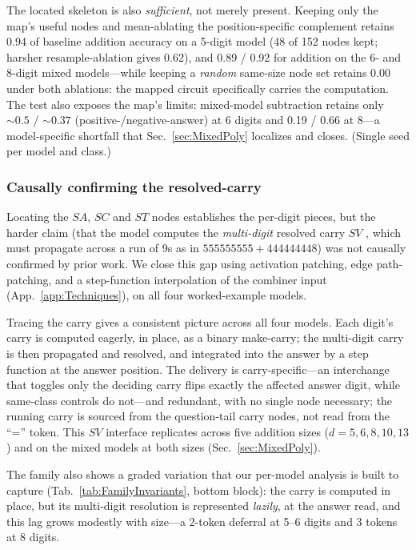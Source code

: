 \documentclass[11pt]{article}
\newcommand{\SAC}{$SA$, }
\newcommand{\SC}{$SC$ }
\newcommand{\ST}{$ST$ }
\newcommand{\SV}{$SV$ }
\begin{document}
The located skeleton is also \emph{sufficient}, not merely present. Keeping only the map's useful nodes and mean-ablating the position-specific complement 
retains 0.94 of baseline addition accuracy on a 5-digit model (48 of 152 nodes kept; harsher resample-ablation gives 0.62), and 0.89 / 0.92 for addition on 
the 6- and 8-digit mixed models---while keeping a \emph{random} same-size node set retains 0.00 under both ablations: the mapped circuit specifically carries 
the computation. The test also exposes the map's limits: mixed-model subtraction retains only ${\sim}0.5$ / ${\sim}0.37$ (positive-/negative-answer) at 6 digits 
and 0.19 / 0.66 at 8---a model-specific shortfall that Sec.~\ref{sec:MixedPoly} localizes and closes. (Single seed per model and class.)


\subsubsection{Causally confirming the resolved-carry}
\label{sec:CausalSV}

Locating the \SAC \SC and \ST nodes establishes the per-digit pieces, but the harder claim (that the model computes the \emph{multi-digit} resolved carry \SV, 
which must propagate across a run of 9s as in $555555555+444444448$) was not causally confirmed by prior work. We close this gap using activation patching,
edge path-patching, and a step-function interpolation of the combiner input (App.~\ref{app:Techniques}), on all four worked-example models.

Tracing the carry gives a consistent picture across all four models. Each digit's carry is computed eagerly, in place, as a binary make-carry; the multi-digit carry 
is then propagated and resolved, and integrated into the answer by a step function at the answer position. The delivery is carry-specific---an interchange that 
toggles only the deciding carry flips exactly the affected answer digit, while same-class controls do not---and redundant, with no single node necessary; the 
running carry is sourced from the question-tail carry nodes, not read from the ``='' token. This \SV interface replicates across five addition sizes
($d = 5, 6, 8, 10, 13$) and on the mixed models at both sizes (Sec.~\ref{sec:MixedPoly}).

The family also shows a graded variation that our per-model analysis is built to capture (Tab.~\ref{tab:FamilyInvariants}, bottom block): the carry is computed 
in place, but its multi-digit resolution is represented \emph{lazily}, at the answer read, and this lag grows modestly with size---a 2-token deferral at 5--6 digits and 3 tokens at 8 digits.
\end{document}
